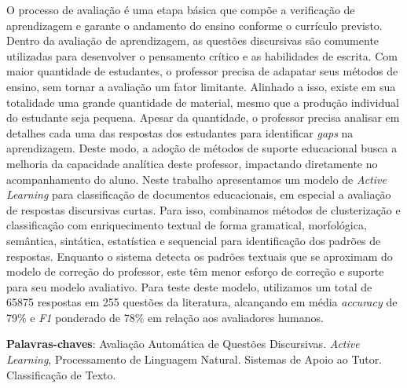 O processo de avaliação é uma etapa básica que compõe a verificação de aprendizagem e garante o andamento do ensino conforme o currículo previsto. Dentro da avaliação de aprendizagem, as questões discursivas são comumente utilizadas para desenvolver o pensamento crítico e as habilidades de escrita. Com maior quantidade de estudantes, o professor precisa de adapatar seus métodos de ensino, sem tornar a avaliação um fator limitante. Alinhado a isso, existe em sua totalidade uma grande quantidade de material, mesmo que a produção individual do estudante seja pequena. Apesar da quantidade, o professor precisa analisar em detalhes cada uma das respostas dos estudantes para identificar \textit{gaps} na aprendizagem. Deste modo, a adoção de métodos de suporte educacional busca a melhoria da capacidade analítica deste professor, impactando diretamente no acompanhamento do aluno. Neste trabalho apresentamos um modelo de \textit{Active Learning} para classificação de documentos educacionais, em especial a avaliação de respostas discursivas curtas. Para isso, combinamos métodos de clusterização e classificação com enriquecimento textual de forma gramatical, morfológica, semântica, sintática, estatística e sequencial para identificação dos padrões de respostas. Enquanto o sistema detecta os padrões textuais que se aproximam do modelo de correção do professor, este têm menor esforço de correção e suporte para seu modelo avaliativo. Para teste deste modelo, utilizamos um total de 65875 respostas em 255 questões da literatura, alcançando em média \textit{accuracy} de 79\% e \textit{F1} ponderado de 78\% em relação aos avaliadores humanos.


\textbf{Palavras-chaves}: Avaliação Automática de Questões Discursivas. \textit{Active Learning}, Processamento de Linguagem Natural. Sistemas de Apoio ao Tutor. Classificação de Texto.
